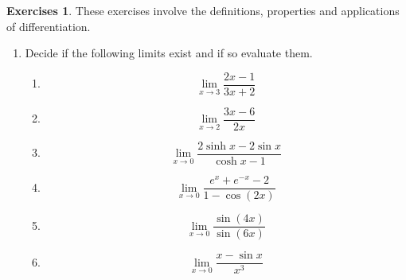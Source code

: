 \documentclass[extrafontsizes, twoside, a4paper]{memoir}
\theoremstyle{plain}%
\theoremstyle{definition}
\newtheorem{exer}{Exercises}[chapter]
\theoremstyle{remark}
\begin{document}
\newpage
\begin{exer}
These exercises involve the definitions, properties and applications of differentiation.
\begin{enumerate}
\item
Decide if the following limits exist and if so evaluate them.
\begin{enumerate}
\item
$$\lim_{x \to 3} \frac{2x-1}{3x+2}$$
\item
$$\lim_{x \to 2} \frac{3x-6}{2x}$$
\item
$$\lim_{x \to 0} \frac{2 \sinh{x} -2 \sin{x}}{\cosh{x} - 1}$$
\item
$$\lim_{x \to 0} \frac{e^x + e^{-x} - 2}{1 - \cos{(2x)}}$$
\item
$$\lim_{x \to 0} \frac{\sin{(4x)}}{\sin{(6x)}}$$
\item
$$\lim_{x \to 0} \frac{x - \sin{x}}{x^3}$$


\end{enumerate}
\end{enumerate}
\end{exer}
\end{document}

